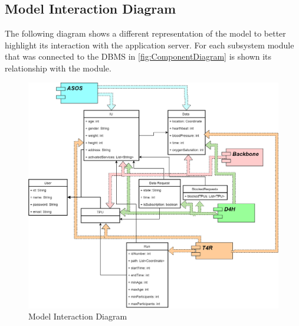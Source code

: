 \subsection{Model Interaction Diagram}
The following diagram shows a different representation of the model to better highlight its interaction with the application server. For each subsystem module that was connected to the DBMS in \ref{fig:ComponentDiagram} is shown its relationship with the module. 
\begin{figure}[H]
\caption{Model Interaction Diagram}
\label{fig:ModelInteractionDiagram}
\centering
\includegraphics[width = \textwidth]{sections/architecturalDesign/modelInteractionDiagram.png}
\end{figure}
\clearpage
